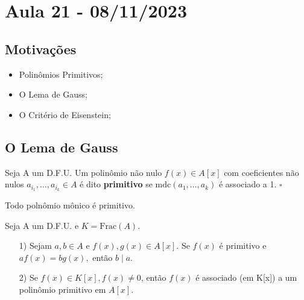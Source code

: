 \documentclass[algebraII_notes.tex]{subfiles}
\begin{document}
\section{Aula 21 - 08/11/2023}
\subsection{Motivações}
\begin{itemize}
	\item Polinômios Primitivos;
	\item O Lema de Gauss;
	\item O Critério de Eisenstein;
\end{itemize}
\subsection{O Lema de Gauss}
\begin{def*}
	Seja A um D.F.U. Um polinômio não nulo \(f(x)\in A[x]\) com coeficientes não nulos \(a_{i_{1}},\dotsc, a_{i_{k}}\in A\) é dito
	\textbf{primitivo} se \(\mathrm{mdc}(a_{1}, \dotsc, a_{k})\) é associado a 1. \(\square\)
\end{def*}
\begin{example}
	Todo polnômio mônico é primitivo.
\end{example}
\begin{lemma*}
	Seja A um D.F.U. e \(K = \mathrm{Frac}(A)\).
	\begin{itemize}
		\item[1)] Sejam \(a, b\in A\) e \(f(x), g(x)\in A[x].\) Se \(f(x)\) é primitivo e \(af(x) = bg(x),\)
		      então \(b\mid a.\)
		\item[2)] Se \(f(x)\in K[x], f(x)\neq 0\), então \(f(x)\) é associado (em K[x]) a um polinômio primitivo em \(A[x]\).
	\end{itemize}
\end{lemma*}
\end{document}
